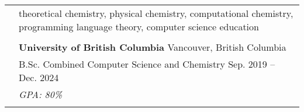 \documentclass[letterpaper, 11pt]{article}
\begin{document}

\vspace{0.5cm}


\setlength{\tabcolsep}{8pt}

\begin{longtable}{p{1.3in}p{4.8in}}

	\nohyphens{\color{Blue}{Research Interests}}
	 & theoretical chemistry, physical chemistry, computational chemistry, programming language theory, computer science education                                                                            \\
	 &                                                                                                                                                                                                        \\

	\color{Blue}{Education}
	 & \textbf{University of British Columbia} \hfill Vancouver, British Columbia                                                                                                                             \\
	 & B.Sc. Combined Computer Science and Chemistry \hfill Sep. 2019 -- Dec. 2024                                                                                                                            \\
	 & {\it GPA: 80\%}                                                                                                                                                                                        \\
	 &                                                                                                                                                                                                        \\


\end{longtable}
\end{document}
